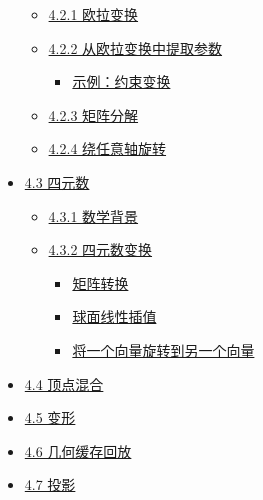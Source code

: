 \documentclass[
  paper=a4,
  ,captions=tableheading
]{scrartcl}
\providecommand{\tightlist}{%
  \setlength{\itemsep}{0pt}\setlength{\parskip}{0pt}}
\begin{document}
\begin{itemize}
        \begin{itemize}
          \tightlist
          \item
                \hyperref[421-ux6b27ux62c9ux53d8ux6362]{4.2.1 欧拉变换}
          \item
                \hyperref[422-ux4eceux6b27ux62c9ux53d8ux6362ux4e2dux63d0ux53d6ux53c2ux6570]{4.2.2
                  从欧拉变换中提取参数}

                \begin{itemize}
                  \tightlist
                  \item
                        \hyperref[ux793aux4f8bux7ea6ux675fux53d8ux6362]{示例：约束变换}
                \end{itemize}
          \item
                \hyperref[423-ux77e9ux9635ux5206ux89e3]{4.2.3 矩阵分解}
          \item
                \hyperref[424-ux7ed5ux4efbux610fux8f74ux65cbux8f6c]{4.2.4
                  绕任意轴旋转}
        \end{itemize}
  \item
        \hyperref[43-ux56dbux5143ux6570]{4.3 四元数}

        \begin{itemize}
          \tightlist
          \item
                \hyperref[431-ux6570ux5b66ux80ccux666f]{4.3.1 数学背景}
          \item
                \hyperref[432-ux56dbux5143ux6570ux53d8ux6362]{4.3.2 四元数变换}

                \begin{itemize}
                  \tightlist
                  \item
                        \hyperref[ux77e9ux9635ux8f6cux6362]{矩阵转换}
                  \item
                        \hyperref[ux7403ux9762ux7ebfux6027ux63d2ux503c]{球面线性插值}
                  \item
                        \hyperref[ux5c06ux4e00ux4e2aux5411ux91cfux65cbux8f6cux5230ux53e6ux4e00ux4e2aux5411ux91cf]{将一个向量旋转到另一个向量}
                \end{itemize}
        \end{itemize}
  \item
        \hyperref[44-ux9876ux70b9ux6df7ux5408]{4.4 顶点混合}
  \item
        \hyperref[45-ux53d8ux5f62]{4.5 变形}
  \item
        \hyperref[46-ux51e0ux4f55ux7f13ux5b58ux56deux653e]{4.6 几何缓存回放}
  \item
        \hyperref[47-ux6295ux5f71]{4.7 投影}


\end{itemize}
\end{document}
